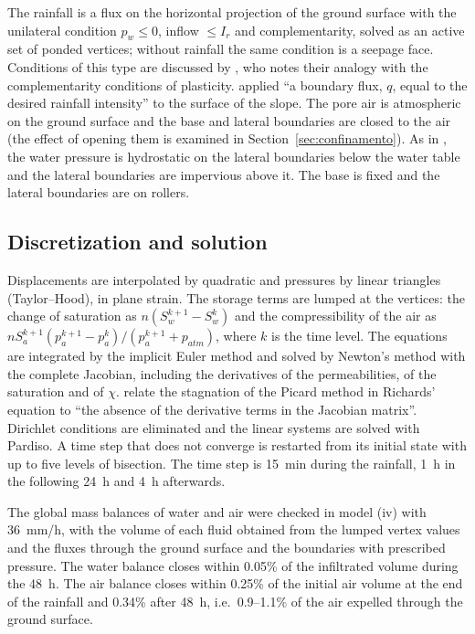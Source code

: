 \documentclass[preprint,12pt,authoryear]{elsarticle}
\begin{document}
The rainfall is a flux on the horizontal projection of the ground surface with the unilateral condition $p_w\le0$,
inflow $\le I_r$ and complementarity, solved as an active set of ponded vertices; without rainfall the same condition
is a seepage face. Conditions of this type are discussed by \citet[Section~3]{pedroso2015}, who notes their analogy
with the complementarity conditions of plasticity. \citet[p.~1534]{rahardjo2007} applied ``a boundary flux, $q$,
equal to the desired rainfall intensity'' to the surface of the slope. The pore air is atmospheric on the ground
surface and the base and lateral boundaries are closed to the air (the effect of opening them is examined in
Section~\ref{sec:confinamento}). As in \citet[p.~1534]{rahardjo2007}, the water pressure is hydrostatic on the
lateral boundaries below the water table and the lateral boundaries are impervious above it. The base is fixed and
the lateral boundaries are on rollers.

\subsection{Discretization and solution}

Displacements are interpolated by quadratic and pressures by linear triangles (Taylor--Hood), in plane strain. The
storage terms are lumped at the vertices: the change of saturation as $n(S_w^{k+1}-S_w^k)$ and the compressibility
of the air as $nS_a^{k+1}(p_a^{k+1}-p_a^k)/(p_a^{k+1}+p_{atm})$, where $k$ is the time level. The equations are
integrated by the implicit Euler method and solved by Newton's method with the complete Jacobian, including the
derivatives of the permeabilities, of the saturation and of $\chi$. \citet[p.~1032]{bergamaschi1999} relate the
stagnation of the Picard method in Richards' equation to ``the absence of the derivative terms in the Jacobian
matrix''. Dirichlet conditions are eliminated and the linear systems are solved with Pardiso. A time step that does
not converge is restarted from its initial state with up to five levels of bisection. The time step is 15~min during
the rainfall, 1~h in the following 24~h and 4~h afterwards.

The global mass balances of water and air were checked in model (iv) with 36~mm/h, with the volume of each fluid
obtained from the lumped vertex values and the fluxes through the ground surface and the boundaries with prescribed
pressure. The water balance closes within 0.05\% of the infiltrated volume during the 48~h. The air balance closes
within 0.25\% of the initial air volume at the end of the rainfall and 0.34\% after 48~h, i.e.\ 0.9--1.1\% of the air
expelled through the ground surface.
\end{document}
